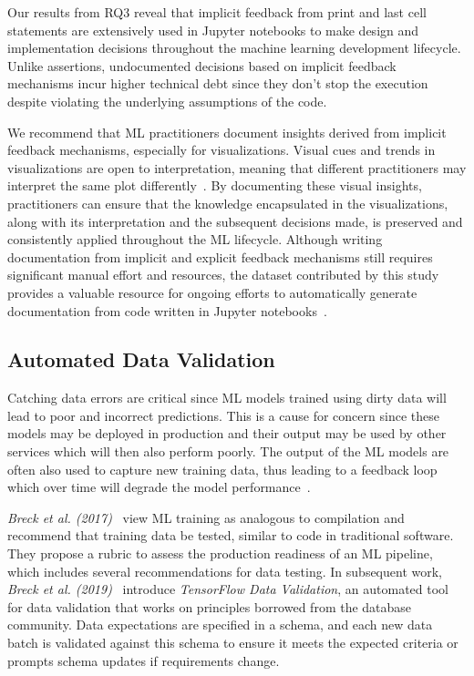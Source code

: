 Our results from RQ3 reveal that implicit feedback from print and last cell statements are extensively used in Jupyter notebooks to make design and implementation decisions throughout the machine learning development lifecycle. Unlike assertions, undocumented decisions based on implicit feedback mechanisms incur higher technical debt since they don't stop the execution despite violating the underlying assumptions of the code.

We recommend that ML practitioners document insights derived from implicit feedback mechanisms, especially for visualizations. Visual cues and trends in visualizations are open to interpretation, meaning that different practitioners may interpret the same plot differently~\cite{heer2010tour}. By documenting these visual insights, practitioners can ensure that the knowledge encapsulated in the visualizations, along with its interpretation and the subsequent decisions made, is preserved and consistently applied throughout the ML lifecycle. Although writing documentation from implicit and explicit feedback mechanisms still requires significant manual effort and resources, the dataset contributed by this study provides a valuable resource for ongoing efforts to automatically generate documentation from code written in Jupyter notebooks~\cite{yang2021subtle}.

\subsection{Automated Data Validation}

Catching data errors are critical since ML models trained using dirty data will lead to poor and incorrect predictions. This is a cause for concern since these models may be deployed in production and their output may be used by other services which will then also perform poorly. The output of the ML models are often also used to capture new training data, thus leading to a feedback loop which over time will degrade the model performance~\cite{sculley2015hidden,breck2019data}.

\emph{Breck et al. (2017)}~\cite{breck2017ml} view ML training as analogous to compilation and recommend that training data be tested, similar to code in traditional software. They propose a rubric to assess the production readiness of an ML pipeline, which includes several recommendations for data testing. In subsequent work, \emph{Breck et al. (2019)}~\cite{breck2019data} introduce \emph{TensorFlow Data Validation}, an automated tool for data validation that works on principles borrowed from the database community. Data expectations are specified in a schema, and each new data batch is validated against this schema to ensure it meets the expected criteria or prompts schema updates if requirements change.

